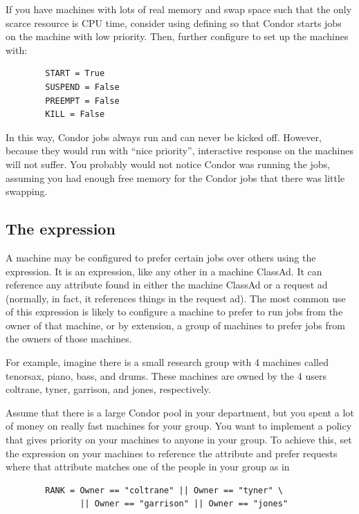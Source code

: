 \Note If you have machines with lots of real memory and swap space such
that the only scarce resource is CPU time, consider using
defining  
so that Condor starts jobs on the machine with low priority.
Then, further configure to set up the machines with:
\begin{verbatim}
        START = True
        SUSPEND = False
        PREEMPT = False
        KILL = False
\end{verbatim}
In this way, Condor jobs always run and can never be kicked off. 
However, because they would run with ``nice priority'', interactive 
response on the machines will not suffer.
You probably would not notice Condor was running the jobs, 
assuming you had enough free memory for the Condor jobs that there
was little swapping.

\subsection{\label{sec:Rank-Expression}
The  expression}

A machine may be configured to prefer certain jobs over others
using the  expression.
It is an
expression, like any other in a machine ClassAd.
It can
reference any attribute found in either the machine ClassAd or a
request ad (normally, in fact, it references things in the request
ad).
The most common use of this expression is likely to configure a
machine to prefer to run jobs from the owner of that machine, or by
extension, a group of machines to prefer jobs from the owners of those
machines.

For example, imagine there is a small research group with 4 machines
called tenorsax, piano, bass, and drums.
These machines are owned by the 4 users
coltrane, tyner, garrison, and jones,
respectively.  

Assume that there is a large Condor pool in your department,
but you spent a lot of money on really fast machines for your group.
You want to implement a policy
that gives priority on your machines to
anyone in your group.
To achieve this, set the 
expression on your machines to reference the  attribute and
prefer requests where that attribute matches one of the people in your
group as in
\begin{verbatim}
        RANK = Owner == "coltrane" || Owner == "tyner" \
               || Owner == "garrison" || Owner == "jones"
\end{verbatim}

